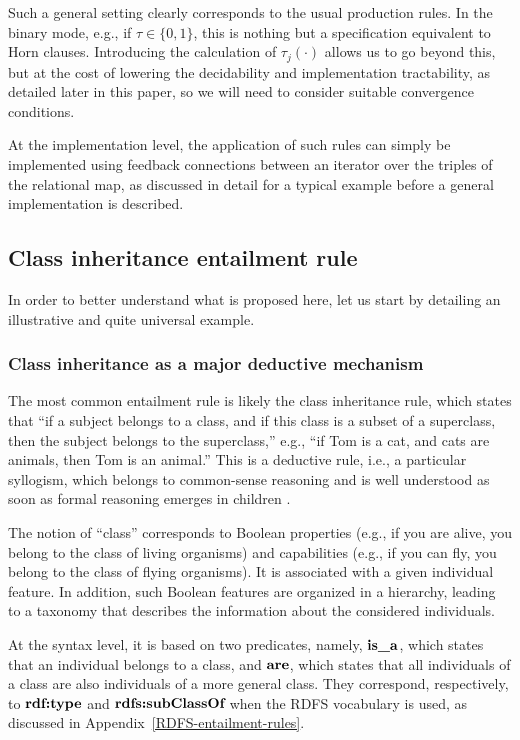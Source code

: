 \documentclass[sn-mathphys]{sn-jnl}
\begin{document}
Such a general setting clearly corresponds to the usual production rules. In the binary mode, e.g., if $\tau \in \{0, 1\}$, this is nothing but a specification equivalent to Horn clauses. Introducing the calculation of $\tau_j(\cdot)$ allows us to go beyond this, but at the cost of lowering the decidability and implementation tractability, as detailed later in this paper, so we will need to consider suitable convergence conditions.

At the implementation level, the application of such rules can simply be implemented using feedback connections between an iterator over the triples of the relational map, as discussed in detail for a typical example before a general implementation is described.

\subsection{Class inheritance entailment rule} \label{inheritance}

In order to better understand what is proposed here, let us start by detailing an illustrative and quite universal example.

\subsubsection{Class inheritance as a major deductive mechanism}

The most common entailment rule is likely the class inheritance rule, which states that ``if a subject belongs to a class, and if this class is a subset of a superclass, then the subject belongs to the superclass,'' e.g., ``if Tom is a cat, and cats are animals, then Tom is an animal.'' This is a deductive rule, i.e., a particular syllogism, which belongs to common-sense reasoning and is well understood as soon as formal reasoning emerges in children \cite{smith_development_1994}.

The notion of ``class'' corresponds to Boolean properties (e.g., if you are alive, you belong to the class of living organisms) and capabilities (e.g., if you can fly, you belong to the class of flying organisms). It is associated with a given individual feature. In addition, such Boolean features are organized in a hierarchy, leading to a taxonomy that describes the information about the considered individuals.

At the syntax level, it is based on two predicates, namely, $\texttt{\bf is\_a}$, which states that an individual belongs to a class, and $\texttt{\bf are}$, which states that all individuals of a class are also individuals of a more general class. They correspond, respectively, to $\texttt{\bf rdf:type}$ and $\texttt{\bf rdfs:subClassOf}$ when the RDFS vocabulary is used, as discussed in Appendix~\ref{RDFS-entailment-rules}.
\end{document}
